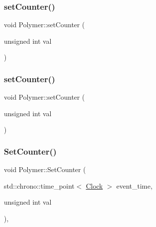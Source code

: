 \subsubsection{\texorpdfstring{set\+Counter()}{setCounter()}\hspace{0.1cm}{\footnotesize\ttfamily [9/10]}}
{\footnotesize\ttfamily void Polymer\+::set\+Counter (\begin{DoxyParamCaption}\item[{unsigned int}]{val }\end{DoxyParamCaption})\hspace{0.3cm}{\ttfamily [inline]}}

\mbox{\label{classPolymer_a7ed6bbe09a570b59f9253d63fd3326d2}} 
\subsubsection{\texorpdfstring{set\+Counter()}{setCounter()}\hspace{0.1cm}{\footnotesize\ttfamily [10/10]}}
{\footnotesize\ttfamily void Polymer\+::set\+Counter (\begin{DoxyParamCaption}\item[{unsigned int}]{val }\end{DoxyParamCaption})\hspace{0.3cm}{\ttfamily [inline]}}

\mbox{\label{classPolymer_a1500ffc682396af2f4306c7c7ea7fd87}} 
\subsubsection{\texorpdfstring{Set\+Counter()}{SetCounter()}}
{\footnotesize\ttfamily void Polymer\+::\+Set\+Counter (\begin{DoxyParamCaption}\item[{std\+::chrono\+::time\+\_\+point$<$ \mbox{\hyperlink{universe_8h_a0ef8d951d1ca5ab3cfaf7ab4c7a6fd80}{Clock}} $>$}]{event\+\_\+time,  }\item[{unsigned int}]{val }\end{DoxyParamCaption})\hspace{0.3cm}{\ttfamily [inline]}, {\ttfamily [virtual]}}



